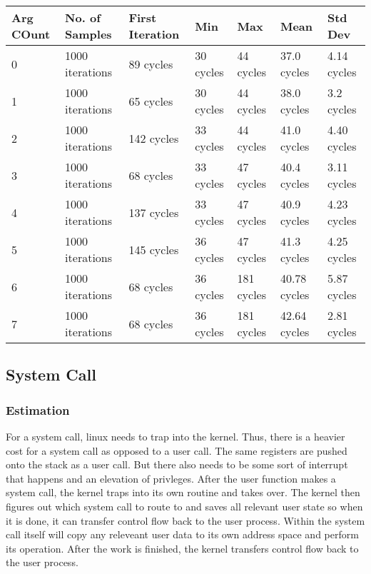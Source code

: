 \documentclass[paper=a4, fontsize=11pt]{scrartcl}
\numberwithin{equation}{section}        %
\numberwithin{figure}{section}          %
\numberwithin{table}{section}               %
\begin{document}
\begin{center}
    \begin{tabular}{ | l | l | l | l | l | l | l |}
    \hline
    Arg COunt & No. of Samples & First Iteration & Min & Max & Mean & Std Dev \\ \hline
   0 & 1000 iterations & 89 cycles & 30 cycles & 44 cycles & 37.0 cycles & 4.14 cycles \\ 
    1 &    1000 iterations & 65 cycles & 30 cycles & 44 cycles & 38.0 cycles & 3.2 cycles \\ 
     2 &       1000 iterations & 142 cycles & 33 cycles & 44 cycles & 41.0 cycles & 4.40 cycles \\ 
       3 &         1000 iterations & 68 cycles & 33 cycles & 47 cycles & 40.4 cycles & 3.11 cycles \\ 
        4 &            1000 iterations & 137 cycles & 33 cycles & 47 cycles & 40.9 cycles & 4.23 cycles \\ 
          5 &              1000 iterations & 145 cycles & 36 cycles & 47 cycles & 41.3 cycles & 4.25 cycles \\ 
             6 &               1000 iterations & 68 cycles & 36 cycles & 181 cycles & 40.78 cycles & 5.87 cycles \\ 
              7 &                  1000 iterations & 68 cycles & 36 cycles & 181 cycles & 42.64 cycles & 2.81 cycles \\ 
    \hline
    \end{tabular}
\end{center}

\subsection{System Call}

\subsubsection{Estimation}

For a system call, linux needs to trap into the kernel. Thus, there is a heavier cost for a system call as opposed to a user call.  The same registers are pushed onto the stack as a user call.  But there also needs to be some sort of interrupt that happens and an elevation of privleges.  After the user function makes a system call,  the kernel traps into its own routine and takes over.  The kernel then figures out which system call to route to and saves all relevant user state so when it is done, it can transfer control flow back to the user process.  Within the system call itself will copy any releveant user data to its own address space and perform its operation.  After the work is finished, the kernel transfers control flow back to the user process.
\end{document}
